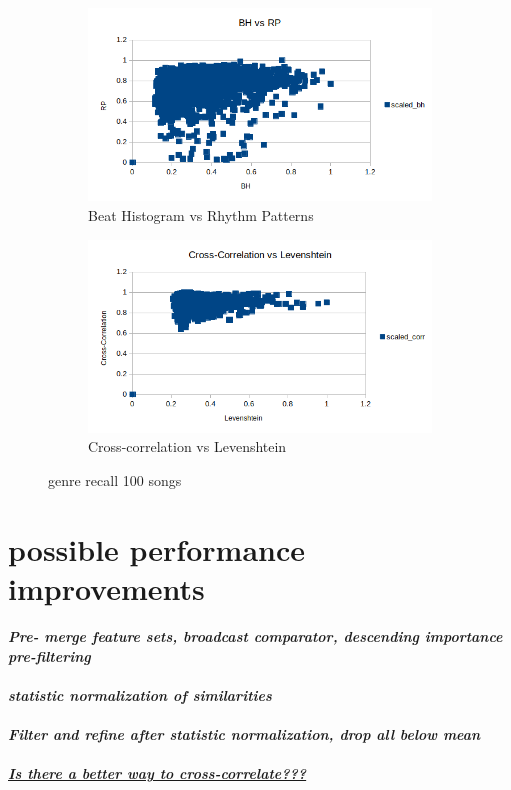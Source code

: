 \begin{figure}[htbp]
{{			\begin{subfigure}{.495\textwidth}
				\centering    
				\includegraphics[scale=0.5]{Images/SparkFeat/BH_RP.png}
				\caption{Beat Histogram vs Rhythm Patterns}
				\label{fs3}
			\end{subfigure}
			\begin{subfigure}{.495\textwidth}
				\centering     
				\includegraphics[scale=0.5]{Images/SparkFeat/Cross-Corr_Levenshtein.png}
				\caption{Cross-correlation vs Levenshtein}
				\label{fs4}
			\end{subfigure}%
	}}
	\caption{genre recall 100 songs}
	\label{fig:featsep}
\end{figure}
\FloatBarrier



\section{possible performance improvements}

\textit{\textbf{Pre- merge feature sets, broadcast comparator, descending importance pre-filtering\\}}
\\
\textit{\textbf{statistic normalization of similarities\\}}
\ \\
\textit{\textbf{Filter and refine after statistic normalization, drop all below mean\\}}
\ \\
\textit{\textbf{\underline{Is there a better way to cross-correlate???}\\}}
\ \\
